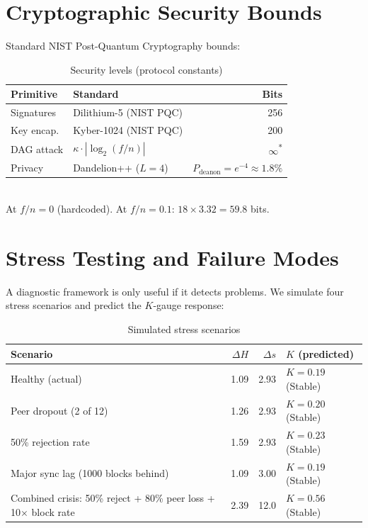 \documentclass[11pt,a4paper,twocolumn]{article}
\begin{document}
\section{Cryptographic Security Bounds}

Standard NIST Post-Quantum Cryptography bounds:

\begin{table}[H]
\centering
\caption{Security levels (\textcolor{sectionblue}{protocol constants})}
\label{tab:security}
\begin{tabular}{@{}llr@{}}
\toprule
\textbf{Primitive} & \textbf{Standard} & \textbf{Bits} \\
\midrule
Signatures   & Dilithium-5 (NIST PQC) & 256 \\
Key encap.   & Kyber-1024 (NIST PQC)  & 200 \\
DAG attack   & $\kappa \cdot |\log_2(f/n)|$ & $\infty$\textsuperscript{*} \\
Privacy      & Dandelion++ ($L=4$)    & $P_{\text{deanon}} = e^{-4} \approx 1.8\%$ \\
\bottomrule
\end{tabular}
\\[2pt]
{\footnotesize *At $f/n=0$ (hardcoded). At $f/n=0.1$: $18 \times 3.32 = 59.8$ bits.}
\end{table}

\section{Stress Testing and Failure Modes}

A diagnostic framework is only useful if it detects problems. We simulate four stress scenarios and predict the $K$-gauge response:

\begin{table}[H]
\centering
\caption{Simulated stress scenarios}
\label{tab:stress}
\small
\begin{tabular}{@{}p{2.2cm}rrp{2.8cm}@{}}
\toprule
\textbf{Scenario} & $\Delta H$ & $\Delta s$ & \textbf{$K$ (predicted)} \\
\midrule
Healthy (actual) & 1.09 & 2.93 & $K = 0.19$ (Stable) \\
Peer dropout (2 of 12) & 1.26 & 2.93 & $K = 0.20$ (Stable) \\
50\% rejection rate & 1.59 & 2.93 & $K = 0.23$ (Stable) \\
Major sync lag (1000 blocks behind) & 1.09 & 3.00 & $K = 0.19$ (Stable) \\
Combined crisis: 50\% reject + 80\% peer loss + 10$\times$ block rate & 2.39 & 12.0 & $K = 0.56$ (Stable) \\
\bottomrule
\end{tabular}
\end{table}
\end{document}
